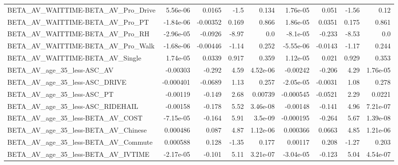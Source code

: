 \begin{tabular}{lrrrrrrrr}
BETA\_AV\_WAITTIME-BETA\_AV\_Pro\_Drive                 &    5.56e-06 &       0.0165 &      -1.5 &    0.134 &   1.76e-05 &       0.051 &        -1.56 &          0.12 \\
BETA\_AV\_WAITTIME-BETA\_AV\_Pro\_PT                    &   -1.84e-06 &     -0.00352 &     0.169 &    0.866 &   1.86e-05 &      0.0351 &        0.175 &         0.861 \\
BETA\_AV\_WAITTIME-BETA\_AV\_Pro\_RH                    &   -2.96e-05 &      -0.0926 &     -8.97 &      0.0 &   -8.1e-05 &      -0.233 &        -8.53 &           0.0 \\
BETA\_AV\_WAITTIME-BETA\_AV\_Pro\_Walk                  &   -1.68e-06 &     -0.00446 &     -1.14 &    0.252 &  -5.55e-06 &     -0.0143 &        -1.17 &         0.244 \\
BETA\_AV\_WAITTIME-BETA\_AV\_Single                    &    1.74e-05 &       0.0339 &     0.917 &    0.359 &   1.12e-05 &       0.021 &        0.929 &         0.353 \\
BETA\_AV\_age\_35\_less-ASC\_AV                         &    -0.00303 &       -0.292 &      4.59 & 4.52e-06 &   -0.00242 &      -0.206 &         4.29 &      1.76e-05 \\
BETA\_AV\_age\_35\_less-ASC\_DRIVE                      &   -0.000401 &      -0.0689 &      1.13 &    0.257 &  -2.05e-05 &     -0.0031 &         1.08 &         0.278 \\
BETA\_AV\_age\_35\_less-ASC\_PT                         &    -0.00119 &       -0.149 &      2.68 &  0.00739 &  -0.000545 &     -0.0521 &         2.29 &        0.0221 \\
BETA\_AV\_age\_35\_less-ASC\_RIDEHAIL                   &    -0.00158 &       -0.178 &      5.52 & 3.46e-08 &   -0.00148 &      -0.141 &         4.96 &      7.21e-07 \\
BETA\_AV\_age\_35\_less-BETA\_AV\_COST                   &   -7.15e-05 &       -0.164 &      5.91 &  3.5e-09 &  -0.000195 &      -0.264 &         5.67 &      1.39e-08 \\
BETA\_AV\_age\_35\_less-BETA\_AV\_Chinese                &    0.000486 &        0.087 &      4.87 & 1.12e-06 &   0.000366 &      0.0663 &         4.85 &      1.21e-06 \\
BETA\_AV\_age\_35\_less-BETA\_AV\_Commute                &    0.000588 &        0.128 &     -1.35 &    0.177 &    0.00117 &       0.208 &        -1.27 &         0.203 \\
BETA\_AV\_age\_35\_less-BETA\_AV\_IVTIME                 &   -2.17e-05 &       -0.101 &      5.11 & 3.21e-07 &  -3.04e-05 &      -0.123 &         5.04 &      4.54e-07 \\

\end{tabular}
